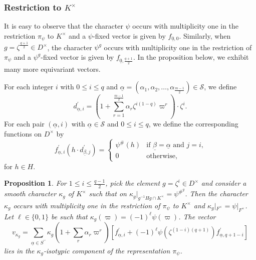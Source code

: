 \documentclass[12pt]{amsart}
\newtheorem{proposition}[theorem]{Proposition}
\theoremstyle{definition}
\theoremstyle{remark}
\begin{document}
\subsubsection{Restriction to $K^\times$}

It is easy to observe that the character $\psi$ occurs with multiplicity one in the restriction $\pi_\psi$ to $K^\times$ and a $\psi$-fixed vector is given by $f_{\underline{0}, 0}$. Similarly, when $g=\zeta^\frac{q+1}{2} \in D^\times$, the character $\psi^g$ occurs with multiplicity one in the restriction of $\pi_\psi$ and a $\psi^g$-fixed vector is given by $f_{\underline{0}, \frac{q+1}{2}}$. In the proposition below, we exhibit many more equivariant vectors.

For each integer $i$ with $0 \leq i \leq q$ and $\underline{\alpha}=(\alpha_1, \alpha_2, \dots,\alpha_{\frac{m-1}{2}}) \in \mathcal{S}$, we define
\[d_{\underline{\alpha}, i}^\prime= (1 + \sum\limits_{r=1}^{\frac{m-1}{2}} \alpha_r \zeta^{i(1-q)} \varpi^r) \cdot \zeta^i.\]
For each pair $(\underline{\alpha},i)$ with $\underline{\alpha} \in \mathcal{S}$ and $0 \leq i \leq q$, we define the corresponding functions on $D^\times$ by 
\[f^\prime_{\underline{\alpha}, i}(h \cdot d^\prime_{\underline{\beta}, j}) = \begin{cases}
\psi^\#(h) &\text{if $\underline{\beta} = \underline{\alpha}$ and $j = i$,} \\
0 &\text{otherwise,}
\end{cases} \]
for $h \in H$.

\begin{proposition}\label{prop2}
For $1 \leq i \leq \frac{q-1}{2}$, pick the element $g=\zeta^i \in D^\times$ and consider a smooth character $\kappa_g$ of $K^\times$ such that on $\kappa_g|_{g^{-1}Hg \cap K^\times} = \psi^{{\#}^g}$. Then the character $\kappa_g$ occurs with multiplicity one in the restriction of $\pi_\psi$ to $K^\times$ and $\kappa_g|_{F^\times} = \psi|_{F^\times}$. Let $\ell \in \{0,1\}$ be such that $\kappa_g(\varpi) = (-1)^\ell \psi(\varpi)$. The vector
\[v_{\kappa_g} = \sum\limits_{\underline{\alpha} \in S^{\prime \prime} } \kappa_g(1 + \sum\limits_{r} \alpha_r \varpi^r) \left[ f_{\underline{\alpha}, i}^\prime + (-1)^\ell \psi(\zeta^{(1-i)(q+1)})  f_{\underline{\alpha}, q+1-i}^\prime \right]\] 
lies in the $\kappa_g$-isotypic component of the representation $\pi_\psi$.
\end{proposition}
\end{document}
